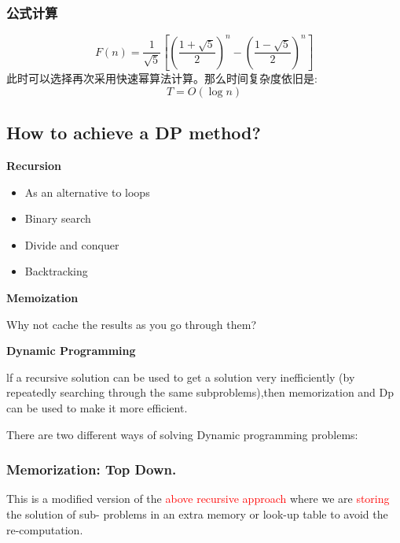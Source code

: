 \documentclass{article}
\begin{document}
\subsubsection{公式计算}
$$F(n) = \frac{1}{\sqrt{5}} \left[ \left(\frac{1 + \sqrt{5}}{2}\right)^n - \left(\frac{1 - \sqrt{5}}{2}\right)^n \right]$$
此时可以选择再次采用快速幂算法计算。那么时间复杂度依旧是:
$$T = O(\log n)$$
\hspace*{\fill}\par

\subsection{How to achieve a DP method?}
\textbf{Recursion}
\begin{itemize}
    \item As an alternative to loops
    \item Binary search
    \item Divide and conquer
    \item Backtracking
\end{itemize}

\hspace*{\fill}\par

\textbf{Memoization}

Why not cache the results as you go through them?


\hspace*{\fill}\par

\textbf{Dynamic Programming}

lf a recursive solution can be used to get a solution very inefficiently (by repeatedly searching through the same subproblems),then memorization and Dp can be used to make it more efficient.

\hspace*{\fill}\par

There are two different ways of solving Dynamic programming problems:

\subsubsection{\textbf{Memorization:} Top Down.}
This is a modified version of the \textcolor{red}{above recursive approach} where we are \textcolor{red}{storing} the solution of sub- problems in an extra memory or look-up table to avoid the re-computation.
\end{document}

